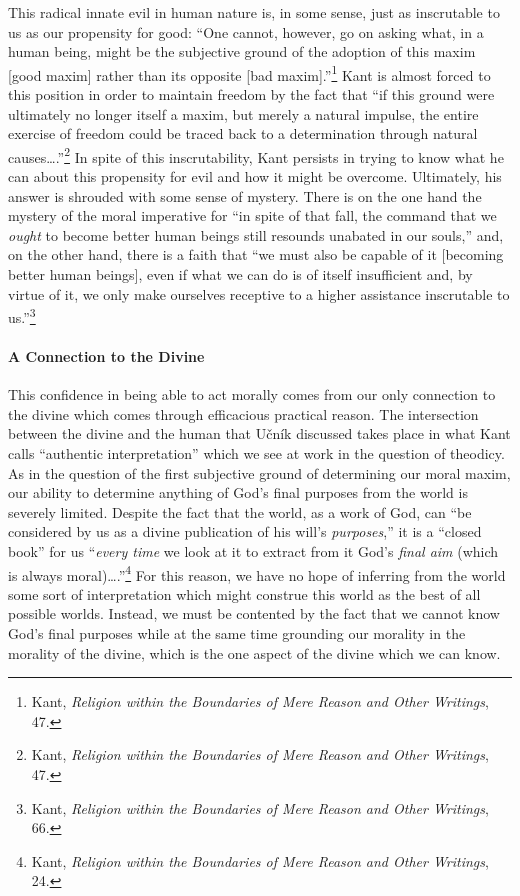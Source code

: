 \documentclass[12pt]{article}
\begin{document}
	This radical innate evil in human nature is, in some sense, just as inscrutable to us as our propensity for good: ``One cannot, however, go on asking what, in a human being, might be the subjective ground of the adoption of this maxim [good maxim] rather than its opposite [bad maxim].''\footnote{Kant, \emph{Religion within the Boundaries of Mere Reason and Other Writings}, 47.} Kant is almost forced to this position in order to maintain freedom by the fact that ``if this ground were ultimately no longer itself a maxim, but merely a natural impulse, the entire exercise of freedom could be traced back to a determination through natural causes\ldots.''\footnote{Kant, \emph{Religion within the Boundaries of Mere Reason and Other Writings}, 47.} In spite of this inscrutability, Kant persists in trying to know what he can about this propensity for evil and how it might be overcome. Ultimately, his answer is shrouded with some sense of mystery. There is on the one hand the mystery of the moral imperative for ``in spite of that fall, the command that we \emph{ought} to become better human beings still resounds unabated in our souls,'' and, on the other hand, there is a faith that ``we must also be capable of it [becoming better human beings], even if what we can do is of itself insufficient and, by virtue of it, we only make ourselves receptive to a higher assistance inscrutable to us.''\footnote{Kant, \emph{Religion within the Boundaries of Mere Reason and Other Writings}, 66.} 
	
	\paragraph*{A Connection to the Divine} This confidence in being able to act morally comes from our only connection to the divine which comes through efficacious practical reason. The intersection between the divine and the human that U\v{c}n\'{i}k discussed takes place in what Kant calls ``authentic interpretation'' which we see at work in the question of theodicy. As in the question of the first subjective ground of determining our moral maxim, our ability to determine anything of God's final purposes from the world is severely limited. Despite the fact that the world, as a work of God, can ``be considered by us as a divine publication of his will's \emph{purposes},'' it is a ``closed book'' for us ``\emph{every time} we look at it to extract from it God's \emph{final aim} (which is always moral)\ldots.''\footnote{Kant, \emph{Religion within the Boundaries of Mere Reason and Other Writings}, 24.} For this reason, we have no hope of inferring from the world some sort of interpretation which might construe this world as the best of all possible worlds. Instead, we must be contented by the fact that we cannot know God's final purposes while at the same time grounding our morality in the morality of the divine, which is the one aspect of the divine which we can know. 
	
\end{document}
